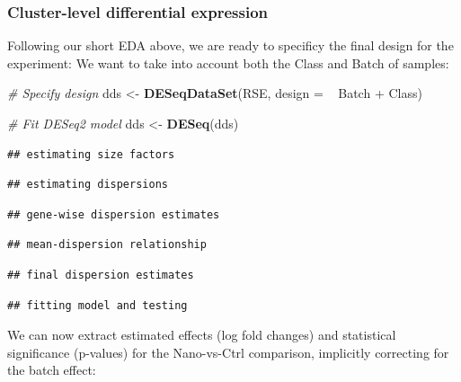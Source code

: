 \documentclass[9pt,a4paper,]{extarticle}
\newenvironment{Shaded}{\begin{snugshade}}{\end{snugshade}}
\newcommand{\KeywordTok}[1]{\textcolor[rgb]{0.13,0.29,0.53}{\textbf{{#1}}}}
\newcommand{\DataTypeTok}[1]{\textcolor[rgb]{0.13,0.29,0.53}{{#1}}}
\newcommand{\StringTok}[1]{\textcolor[rgb]{0.31,0.60,0.02}{{#1}}}
\newcommand{\CommentTok}[1]{\textcolor[rgb]{0.56,0.35,0.01}{\textit{{#1}}}}
\newcommand{\NormalTok}[1]{{#1}}
\begin{document}
\subsubsection{Cluster-level differential expression}\label{cluster-level-differential-expression}

Following our short EDA above, we are ready to specificy the final design for the experiment: We want to take into account both the Class and Batch of samples:

\begin{Shaded}
\begin{Highlighting}[]
\CommentTok{# Specify design}
\NormalTok{dds <-}\StringTok{ }\KeywordTok{DESeqDataSet}\NormalTok{(RSE, }\DataTypeTok{design =} \NormalTok{~}\StringTok{ }\NormalTok{Batch +}\StringTok{ }\NormalTok{Class)}

\CommentTok{# Fit DESeq2 model}
\NormalTok{dds <-}\StringTok{ }\KeywordTok{DESeq}\NormalTok{(dds)}
\end{Highlighting}
\end{Shaded}

\begin{verbatim}
## estimating size factors
\end{verbatim}

\begin{verbatim}
## estimating dispersions
\end{verbatim}

\begin{verbatim}
## gene-wise dispersion estimates
\end{verbatim}

\begin{verbatim}
## mean-dispersion relationship
\end{verbatim}

\begin{verbatim}
## final dispersion estimates
\end{verbatim}

\begin{verbatim}
## fitting model and testing
\end{verbatim}

We can now extract estimated effects (log fold changes) and statistical significance (p-values) for the Nano-vs-Ctrl comparison, implicitly correcting for the batch effect:
\end{document}

